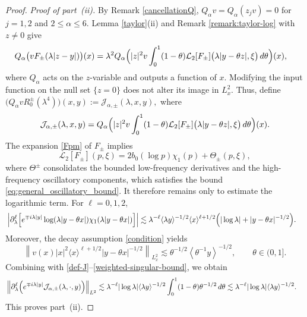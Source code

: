 \documentclass[reqno]{amsart}
\numberwithin{equation}{section}
\begin{document}
\begin{proof}
	\textit{Proof of part~{\rm (ii)}.}
	By Remark \ref{cancellationQ},
	$
	Q_\alpha v
	=
	Q_\alpha(z_jv)
	=
	0
	$ for $ j=1,2$ and $ 2\leq\alpha\leq6.$
 Lemma \ref{taylor}(ii) and Remark \ref{remark:taylor-log} with $z\neq0$ give
	\begin{align*}
		&
		Q_\alpha
		\bigl(
		vF_\pm(\lambda|z-y|)
		\bigr)(x)=
		\lambda^2
		Q_\alpha
		\Bigl(
		|z|^2v
		\int_0^1
		(1-\theta)
		\mathcal{L}_2[F_\pm]
		\bigl(
		\lambda|y-\theta z|,
		\xi
		\bigr)
		\,d\theta
		\Bigr)(x),
	\end{align*}
	where \(Q_\alpha\) acts on the \(z\)-variable and outputs a function of \(x\). Modifying the input function on the
	null set \(\{z=0\}\) does not alter its image  in \(L_x^2\).
   Thus, define
	$
	\bigl(Q_\alpha vR_0^\pm(\lambda^4)\bigr)(x,y)
	:=
	\mathcal{J}_{\alpha,\pm}(\lambda,x,y),
	$
	where
\begin{equation}\label{def-J}
		\mathcal{J}_{\alpha,\pm}(\lambda,x,y)
		=
		Q_\alpha
		\Bigl(
		|z|^2v
		\int_0^1
		(1-\theta)
		\mathcal{L}_2[F_\pm]
		\bigl(
		\lambda|y-\theta z|,
		\xi
		\bigr)
		\,d\theta
		\Bigr)(x).
	\end{equation}
	The expansion \eqref{Fpm} of $F_\pm$ implies
	\begin{equation}\label{L2-decomposition}
		\mathcal{L}_2[F_\pm](p,\xi)
		=
		2b_0(\log p)\chi_1(p)
		+
		\Theta_\pm(p,\xi),
	\end{equation}
		where $\Theta^\pm$ consolidates the bounded low-frequency derivatives and the high-frequency oscillatory components, which  satisfies the bound \eqref{eq:general_oscillatory_bound}. 
	It therefore remains only to estimate the logarithmic term. For
 $\ell=0,1,2$,
	\begin{align}
		&
		\left|
		\partial_\lambda^\ell
		\Bigl[
		e^{\mp i\lambda|y|}
		\log(\lambda |y-\theta x|)
		\chi_1(\lambda |y-\theta x|)
		\Bigr]
		\right|
	\lesssim
		\lambda^{-\ell}
		\langle\lambda y\rangle^{-1/2}
		\langle x\rangle^{\ell+1/2}
		\Bigl(
		|\log\lambda|
		+
		|y-\theta x|^{-1/2}
		\Bigr).
		\label{log-profile-bound}
	\end{align}
	Moreover, the decay assumption \eqref{condition} yields
	\begin{equation}\label{weighted-singular-bound}
		\left\|
		v(x)|x|^2
		\langle x\rangle^{\ell+1/2}
		|y-\theta x|^{-1/2}
		\right\|_{L^2_x}
		\lesssim
		\theta^{-1/2}
		\left\langle\theta^{-1}y\right\rangle^{-1/2},
		\qquad \theta\in (0,1].
	\end{equation}
	Combining with  \eqref{def-J}--\eqref{weighted-singular-bound}, we obtain
	\begin{align*}
		&
		\left\|
		\partial_\lambda^\ell
		\Bigl(
		e^{\mp i\lambda|y|}
		\mathcal{J}_{\alpha,\pm}(\lambda,\cdot,y)
		\Bigr)
		\right\|_{L^2}
	\lesssim
		\lambda^{-\ell}
		|\log\lambda|
		\langle\lambda y\rangle^{-1/2}
		\int_0^1
		(1-\theta)\theta^{-1/2}
		\,d\theta
	\lesssim
		\lambda^{-\ell}
		|\log\lambda|
		\langle\lambda y\rangle^{-1/2}.
	\end{align*}
	This proves part~{\rm (ii)}.
	

\end{proof}
\end{document}
